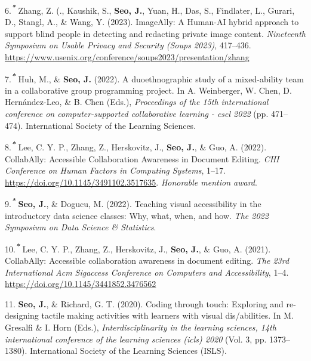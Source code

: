 \documentclass[11pt,a4paper,]{awesome-cv}
\begin{document}
\leavevmode\hypertarget{ref-289496}{}%
6.\textsuperscript{\emph{\textbf{*}}} Zhang, Z. (., Kaushik, S.,
\textbf{Seo, J.}, Yuan, H., Das, S., Findlater, L., Gurari, D., Stangl,
A., \& Wang, Y. (2023). ImageAlly: A Human-AI hybrid approach to support
blind people in detecting and redacting private image content.
\emph{Nineteenth Symposium on Usable Privacy and Security (Soups 2023)},
417--436.
\url{https://www.usenix.org/conference/soups2023/presentation/zhang}

\leavevmode\hypertarget{ref-huh2022duoethnographic}{}%
7.\textsuperscript{\emph{\textbf{*}}} Huh, M., \& \textbf{Seo, J.}
(2022). A duoethnographic study of a mixed-ability team in a
collaborative group programming project. In A. Weinberger, W. Chen, D.
Hernández-Leo, \& B. Chen (Eds.), \emph{Proceedings of the 15th
  international conference on computer-supported collaborative learning -
  cscl 2022} (pp. 471--474). International Society of the Learning
Sciences.

\leavevmode\hypertarget{ref-leeCollabAllyAccessibleCollaboration2022a}{}%
8.\textsuperscript{\emph{\textbf{*}}} Lee, C. Y. P., Zhang, Z.,
Herskovitz, J., \textbf{Seo, J.}, \& Guo, A. (2022). CollabAlly:
Accessible Collaboration Awareness in Document Editing. \emph{CHI
  Conference on Human Factors in Computing Systems}, 1--17.
\url{https://doi.org/10.1145/3491102.3517635}. \emph{Honorable mention
  award}.

\leavevmode\hypertarget{ref-teachingvisualaccessibility2022}{}%
9.\textsuperscript{\emph{\textbf{*}}} \textbf{Seo, J.}, \& Dogucu, M.
(2022). Teaching visual accessibility in the introductory data science
classes: Why, what, when, and how. \emph{The 2022 Symposium on Data
  Science \& Statistics}.

\leavevmode\hypertarget{ref-lee2021collabally}{}%
10.\textsuperscript{\emph{\textbf{*}}} Lee, C. Y. P., Zhang, Z.,
Herskovitz, J., \textbf{Seo, J.}, \& Guo, A. (2021). CollabAlly:
Accessible collaboration awareness in document editing. \emph{The 23rd
  International Acm Sigaccess Conference on Computers and Accessibility},
1--4. \url{https://doi.org/10.1145/3441852.3476562}

\leavevmode\hypertarget{ref-seo2020coding}{}%
11. \textbf{Seo, J.}, \& Richard, G. T. (2020). Coding through touch:
Exploring and re-designing tactile making activities with learners with
visual dis/abilities. In M. Gresalfi \& I. Horn (Eds.),
\emph{Interdisciplinarity in the learning sciences, 14th international
  conference of the learning sciences (icls) 2020} (Vol. 3, pp.
1373--1380). International Society of the Learning Sciences (ISLS).
\end{document}
